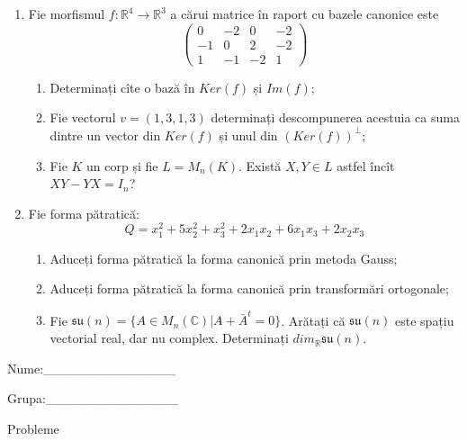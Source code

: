 \documentclass{article}
\begin{document}
\begin{enumerate}
 \item Fie morfismul $f:\mathbb{R}^4 \to \mathbb{R}^3$ a cărui matrice în raport cu bazele canonice este
$$\begin{pmatrix}
0&-2&0&-2\\
-1&0&2&-2\\
1&-1&-2&1
\end{pmatrix}$$

\begin{enumerate}
\item Determinați cîte o bază în $Ker(f)$ și $Im(f)$;
\item Fie vectorul $v=(1,3,1,3)$ determinați descompunerea acestuia ca suma dintre un vector din $Ker(f)$ și unul din $(Ker(f))^\perp$;
\item Fie $K$ un corp și fie $L=M_n(K)$. Există $X,Y \in L$ astfel încît $XY-YX=I_n$?  
\end{enumerate}
\item Fie forma pătratică:
$$Q= x_1^2+5x_2^2+x_3^2+2x_1x_2+6x_1x_3+2x_2x_3$$

\begin{enumerate}
\item Aduceți forma pătratică la forma canonică prin metoda Gauss;
\item Aduceți forma pătratică la forma canonică prin transformări ortogonale;
\item Fie $\mathfrak{su}(n)=\{ A \in M_n(\mathbb{C}) | A+\bar{A}^t=0\}$. Arătați că $\mathfrak{su}(n)$ este spațiu vectorial real, dar nu complex.
Determinați $dim_{\mathbb{R}}\mathfrak{su}(n)$.
\end{enumerate}
\end{enumerate}
\newpage
\begin{flushright}
Nume:\_\_\_\_\_\_\_\_\_\_\_\_\_\_
 
 
Grupa:\_\_\_\_\_\_\_\_\_\_\_\_\_\_
\end{flushright}
\begin{center}
\vspace{2cm}
{\Large Probleme}
\vspace{2cm}
\end{center}
\end{document}
